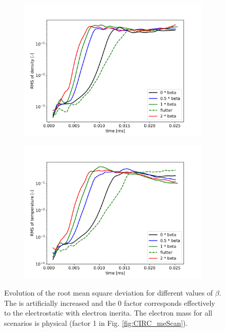 \begin{figure}[H]\centering
	\begin{subfigure}[t]{0.45\textwidth}
		\centering
		\includegraphics[width=1\textwidth]{schemes/RMSn_betaScan.jpg}
	\end{subfigure}
	\begin{subfigure}[t]{0.45\textwidth}
		\centering
		\includegraphics[width=1\textwidth]{schemes/RMST_betaScan.jpg}
	\end{subfigure}
	\caption[Evolution of the root mean square deviation for different values of $\beta$]{Evolution of the root mean square deviation for different values of $\beta$. The  is artificially increased and the 0 factor corresponds effectively to the electrostatic with electron inerita. The electron mass for all scenarios is physical (factor 1 in Fig. \ref{fig:CIRC_meScan}).}
	\label{fig:CIRC_betaScan}
\end{figure}

